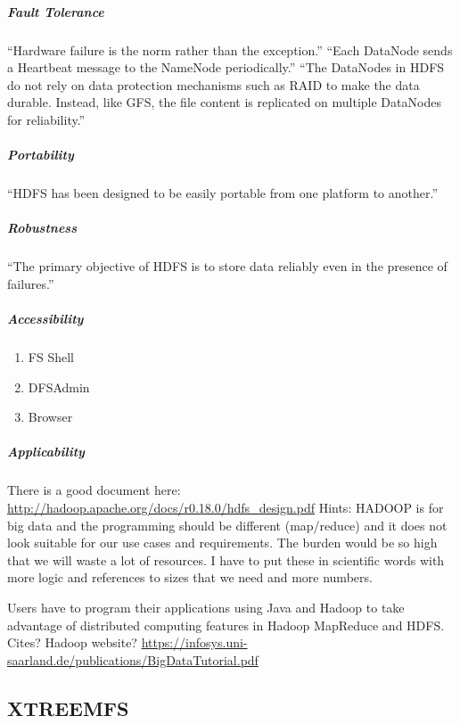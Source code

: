 \subparagraph{Fault Tolerance}
``Hardware failure is the norm rather than the exception.''
``Each DataNode sends a Heartbeat message to the NameNode periodically.''
``The DataNodes in HDFS do not rely on data protection mechanisms 
such as RAID to make the data durable. Instead, like GFS, 
the file content is replicated on multiple DataNodes for reliability.''
\cite{TheHDFS}
\subparagraph{Portability}


``HDFS has been designed to be easily portable from one platform to another.''
\subparagraph{Robustness}

``The primary objective of HDFS is to store data reliably even in the presence of failures.''
\subparagraph{Accessibility}
\begin{enumerate}
\item FS Shell
\item DFSAdmin
\item Browser
\end{enumerate}

\subparagraph{Applicability}
There is a good document here:
\url{http://hadoop.apache.org/docs/r0.18.0/hdfs_design.pdf}
Hints: HADOOP is for big data and the programming should be different (map/reduce)
 and it does not look suitable for our use cases and requirements. The burden would
 be so high that we will waste a lot of resources. I have to put these in scientific
 words with more logic and references to sizes that we need and more numbers.

Users have to program their applications using Java and Hadoop to 
take advantage of distributed computing features in Hadoop MapReduce
and HDFS. Cites? Hadoop website?
\url{https://infosys.uni-saarland.de/publications/BigDataTutorial.pdf}

\subsection{XTREEMFS}
